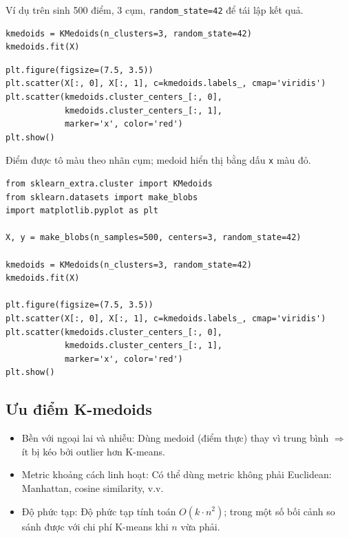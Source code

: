 \begin{ynghia}[title={Dataset make\_blobs}]
Ví dụ trên sinh 500 điểm, 3 cụm, \texttt{random\_state=42} để tái lập kết quả.
\end{ynghia}

\begin{vidu}[title={Huấn luyện KMedoids}]
\begin{lstlisting}
kmedoids = KMedoids(n_clusters=3, random_state=42)
kmedoids.fit(X)
\end{lstlisting}
\end{vidu}

\begin{vidu}[title={Vẽ kết quả phân cụm}]
\begin{lstlisting}
plt.figure(figsize=(7.5, 3.5))
plt.scatter(X[:, 0], X[:, 1], c=kmedoids.labels_, cmap='viridis')
plt.scatter(kmedoids.cluster_centers_[:, 0],
            kmedoids.cluster_centers_[:, 1],
            marker='x', color='red')
plt.show()
\end{lstlisting}
\end{vidu}

\begin{ynghia}[title={Đồ thị kết quả}]
Điểm được tô màu theo nhãn cụm; medoid hiển thị bằng dấu \texttt{x} màu đỏ.

\end{ynghia}

\begin{vidu}[title={Code đầy đủ}]
\begin{lstlisting}
from sklearn_extra.cluster import KMedoids
from sklearn.datasets import make_blobs
import matplotlib.pyplot as plt

X, y = make_blobs(n_samples=500, centers=3, random_state=42)

kmedoids = KMedoids(n_clusters=3, random_state=42)
kmedoids.fit(X)

plt.figure(figsize=(7.5, 3.5))
plt.scatter(X[:, 0], X[:, 1], c=kmedoids.labels_, cmap='viridis')
plt.scatter(kmedoids.cluster_centers_[:, 0],
            kmedoids.cluster_centers_[:, 1],
            marker='x', color='red')
plt.show()
\end{lstlisting}
\end{vidu}

\subsection{Ưu điểm K-medoids}

\begin{tinhchat}[title={Ưu điểm K-medoids}]
  \begin{itemize}
    \item Bền với ngoại lai và nhiễu: Dùng medoid (điểm thực) thay vì trung bình $\Rightarrow$ ít bị kéo bởi outlier hơn K-means.
    \item Metric khoảng cách linh hoạt: Có thể dùng metric không phải Euclidean: Manhattan, cosine similarity, v.v.
    \item Độ phức tạp: Độ phức tạp tính toán $O(k \cdot n^2)$; trong một số bối cảnh so sánh được với chi phí K-means khi $n$ vừa phải.
  \end{itemize}
\end{tinhchat}

